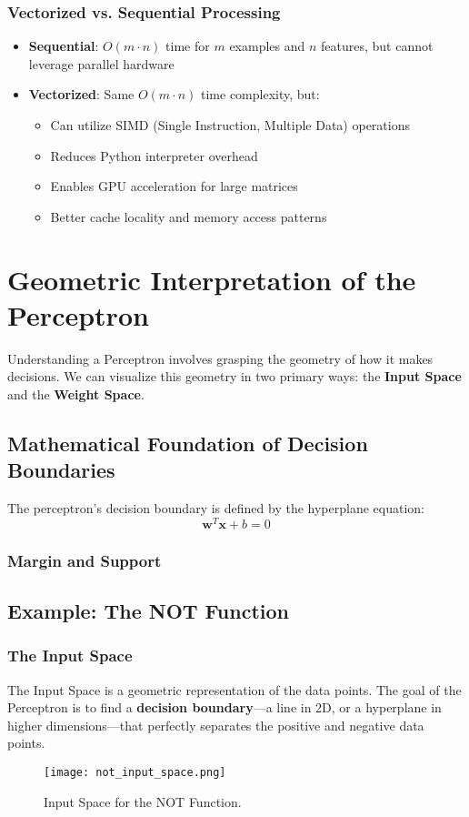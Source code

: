 \subsubsection{Vectorized vs. Sequential Processing}
\begin{itemize}
    \item \textbf{Sequential}: \(O(m \cdot n)\) time for \(m\) examples and \(n\) features, but cannot leverage parallel hardware
    \item \textbf{Vectorized}: Same \(O(m \cdot n)\) time complexity, but:
    \begin{itemize}
        \item Can utilize SIMD (Single Instruction, Multiple Data) operations
        \item Reduces Python interpreter overhead
        \item Enables GPU acceleration for large matrices
        \item Better cache locality and memory access patterns
    \end{itemize}
\end{itemize}

\section{Geometric Interpretation of the Perceptron}
Understanding a Perceptron involves grasping the geometry of how it makes decisions. We can visualize this geometry in two primary ways: the \textbf{Input Space} and the \textbf{Weight Space}.

\subsection{Mathematical Foundation of Decision Boundaries}
The perceptron's decision boundary is defined by the hyperplane equation:
\[\mathbf{w}^T \mathbf{x} + b = 0\]



\subsubsection{Margin and Support}


\subsection{Example: The NOT Function}
\subsubsection{The Input Space}
The Input Space is a geometric representation of the data points. The goal of the Perceptron is to find a \textbf{decision boundary}---a line in 2D, or a hyperplane in higher dimensions---that perfectly separates the positive and negative data points.
\begin{figure}[h!]
\centering
\texttt{[image: not\_input\_space.png]}
\caption{Input Space for the NOT Function.}
\end{figure}

